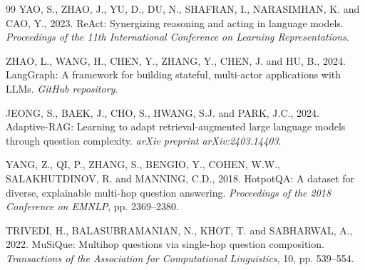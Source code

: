 \documentclass[12pt,a4paper]{article}
\begin{document}
\begin{thebibliography}{99}
YAO, S., ZHAO, J., YU, D., DU, N., SHAFRAN, I., NARASIMHAN, K. and CAO, Y., 2023. ReAct: Synergizing reasoning and acting in language models. \textit{Proceedings of the 11th International Conference on Learning Representations}.

ZHAO, L., WANG, H., CHEN, Y., ZHANG, Y., CHEN, J. and HU, B., 2024. LangGraph: A framework for building stateful, multi-actor applications with LLMs. \textit{GitHub repository}.

JEONG, S., BAEK, J., CHO, S., HWANG, S.J. and PARK, J.C., 2024. Adaptive-RAG: Learning to adapt retrieval-augmented large language models through question complexity. \textit{arXiv preprint arXiv:2403.14403}.

YANG, Z., QI, P., ZHANG, S., BENGIO, Y., COHEN, W.W., SALAKHUTDINOV, R. and MANNING, C.D., 2018. HotpotQA: A dataset for diverse, explainable multi-hop question answering. \textit{Proceedings of the 2018 Conference on EMNLP}, pp. 2369--2380.

TRIVEDI, H., BALASUBRAMANIAN, N., KHOT, T. and SABHARWAL, A., 2022. MuSiQue: Multihop questions via single-hop question composition. \textit{Transactions of the Association for Computational Linguistics}, 10, pp. 539--554.

\end{thebibliography}
\end{document}
